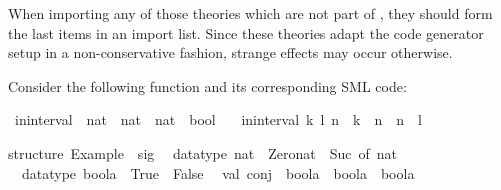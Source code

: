 \begin{isabellebody}
\begin{isamarkuptext}
  \begin{warn}
    When importing any of those theories which are not part of
    , they should form the last
    items in an import list.  Since these theories adapt the code
    generator setup in a non-conservative fashion, strange effects may
    occur otherwise.
  \end{warn}%
\end{isamarkuptext}%
\isamarkuptrue%
%
\isamarkuptrue%
%
\begin{isamarkuptext}%
Consider the following function and its corresponding SML code:%
\end{isamarkuptext}%
\isamarkuptrue%
%
\isadelimquote
%
\endisadelimquote
%
\isatagquote
{}\isamarkupfalse%
\ in{}interval\ {}{}\ {}nat\ {}\ nat\ {}\ nat\ {}\ bool{}\ \isanewline
\ \ {}in{}interval\ {}k{}\ l{}\ n\ {}\ k\ {}\ n\ {}\ n\ {}\ l{}%
\endisatagquote
{\isafoldquote}%
%
\isadelimquote
%
\endisadelimquote
%
\isadeliminvisible
%
\endisadeliminvisible
%
\isataginvisible
%
\endisataginvisible
{\isafoldinvisible}%
%
\isadeliminvisible
%
\endisadeliminvisible
%
\isadelimquotetypewriter
%
\endisadelimquotetypewriter
%
\isatagquotetypewriter
%
\begin{isamarkuptext}%
structure\ Example\ {}\ sig\isanewline
\ \ datatype\ nat\ {}\ Zero{}nat\ {}\ Suc\ of\ nat\isanewline
\ \ datatype\ boola\ {}\ True\ {}\ False\isanewline
\ \ val\ conj\ {}\ boola\ {}{}\ boola\ {}{}\ boola\isanewline

\end{isamarkuptext}
\end{isabellebody}
